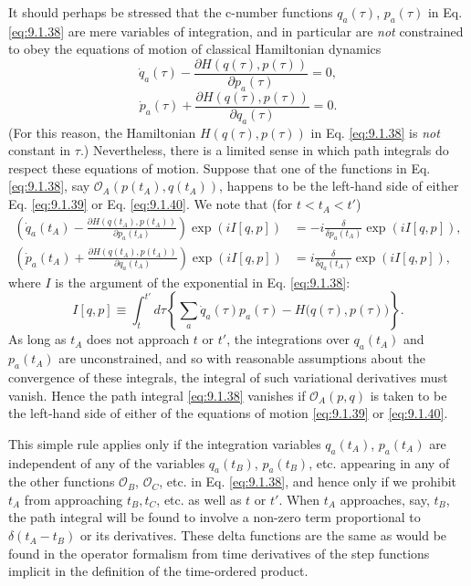 It should perhaps be stressed that the c-number functions $q_a(\tau)$,
$p_a(\tau)$ in Eq. \eqref{eq:9.1.38} are mere variables of integration, and in
particular are \emph{not} constrained to obey the equations of motion of
classical Hamiltonian dynamics
\begin{equation}
  \dot q_a(\tau)-
  \frac{\partial H(q(\tau),p(\tau))}{\partial p_a(\tau)}=0,
  \tag{9.1.39}\label{eq:9.1.39}
\end{equation}
\begin{equation}
  \dot p_a(\tau)+
  \frac{\partial H(q(\tau),p(\tau))}{\partial q_a(\tau)}=0.
  \tag{9.1.40}\label{eq:9.1.40}
\end{equation}
(For this reason, the Hamiltonian $H(q(\tau),p(\tau))$ in Eq. \eqref{eq:9.1.38} is
\emph{not} constant in $\tau$.) Nevertheless, there is a limited sense in
which path integrals do respect these equations of motion. Suppose that one
of the functions in Eq. \eqref{eq:9.1.38}, say
$\mathcal{O}_A(p(t_A),q(t_A))$, happens to be the left-hand side of either
Eq. \eqref{eq:9.1.39} or Eq. \eqref{eq:9.1.40}. We note that (for $t<t_A<t'$)
\begin{align*}
  \left(\dot q_a(t_A)-
  \frac{\partial H(q(t_A),p(t_A))}{\partial p_a(t_A)}\right)
  \exp(iI[q,p])
  &=-i\frac{\delta}{\delta p_a(t_A)}\exp(iI[q,p]),\\
  \left(\dot p_a(t_A)+
  \frac{\partial H(q(t_A),p(t_A))}{\partial q_a(t_A)}\right)
  \exp(iI[q,p])
  &=i\frac{\delta}{\delta q_a(t_A)}\exp(iI[q,p]),
\end{align*}
where $I$ is the argument of the exponential in Eq. \eqref{eq:9.1.38}:
\[
  I[q,p]\equiv\int_t^{t'}d\tau
  \left\{\sum_a\dot q_a(\tau)p_a(\tau)
  -H\bigl(q(\tau),p(\tau)\bigr)\right\}.
\]
As long as $t_A$ does not approach $t$ or $t'$, the integrations over
$q_a(t_A)$ and $p_a(t_A)$ are unconstrained, and so with reasonable
assumptions about the convergence of these integrals, the integral of such
variational derivatives must vanish. Hence the path integral \eqref{eq:9.1.38}
vanishes if $\mathcal{O}_A(p,q)$ is taken to be the left-hand side of either
of the equations of motion \eqref{eq:9.1.39} or \eqref{eq:9.1.40}.

This simple rule applies only if the integration variables $q_a(t_A)$,
$p_a(t_A)$ are independent of any of the variables $q_a(t_B)$, $p_a(t_B)$,
etc. appearing in any of the other functions $\mathcal{O}_B$,
$\mathcal{O}_C$, etc. in Eq. \eqref{eq:9.1.38}, and hence only if we prohibit $t_A$
from approaching $t_B,t_C$, etc. as well as $t$ or $t'$. When $t_A$
approaches, say, $t_B$, the path integral will be found to involve a non-zero
term proportional to $\delta(t_A-t_B)$ or its derivatives. These delta
functions are the same as would be found in the operator formalism from
time derivatives of the step functions implicit in the definition of the
time-ordered product.

